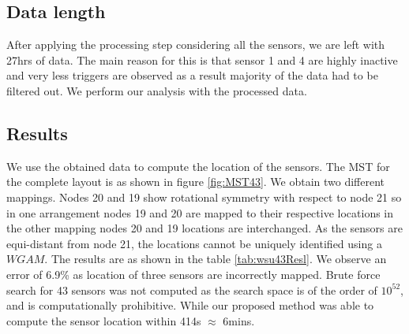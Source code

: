 \subsection{Data length}
After applying the processing step considering all the sensors, we are left with 27hrs of data. The main reason for this is that sensor 1 and 4 are highly inactive and very less triggers are observed as a result majority of the data had to be filtered out. We perform our analysis with the processed data.


\subsection{Results}

We use the obtained data to compute the location of the sensors. The MST for the complete layout is as shown in figure \ref{fig:MST43}. We obtain two different mappings. 
Nodes 20 and 19 show rotational symmetry with respect to node 21 so in one arrangement nodes 19 and 20 are mapped to their respective locations in the other mapping nodes 20 and 19 locations are interchanged. As the sensors are equi-distant from node 21, the locations cannot be uniquely identified using a $WGAM$. 
The results are as shown in the table \ref{tab:wsu43Resl}. We observe an error of 6.9\% as location of three sensors are incorrectly mapped.
Brute force search for 43 sensors was not computed as the search space is of the order of $10^{52}$, and is computationally prohibitive.
While our proposed method was able to compute the sensor location within 414s $\approx$ 6mins. 
  
  

